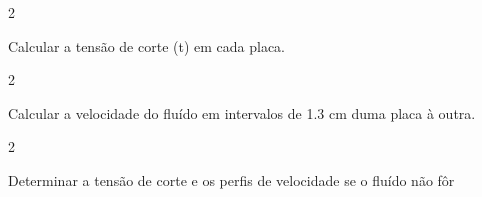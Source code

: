\documentclass[\mainfilename]{subfiles}
\begin{document}
\begin{exampleBox}2{}
    
    Calcular a tensão de corte (t) em cada placa.
    
\end{exampleBox}

\begin{exampleBox}2{}
    
    Calcular a velocidade do fluído em intervalos de 1.3 cm duma placa à outra.
    
\end{exampleBox}

\begin{exampleBox}2{}
    
    Determinar a tensão de corte e os perfis de velocidade se o fluído não fôr
    
\end{exampleBox}
\end{document}
